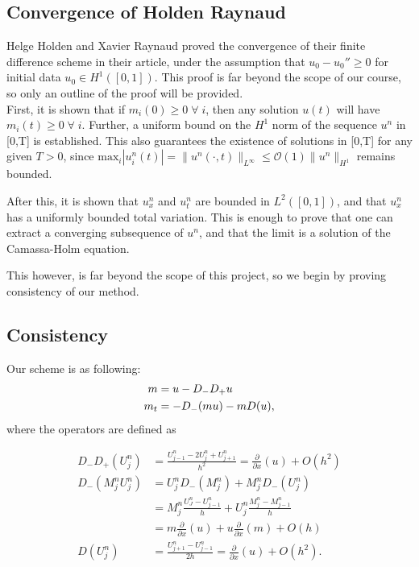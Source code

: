 \subsection*{Convergence of Holden Raynaud}
Helge Holden and Xavier Raynaud proved the convergence of their finite difference scheme in their article, under the assumption that $u_{0} - u_{0}'' \geq 0$ for initial data $u_{0} \in H^{1}([0,1])$. This proof is far beyond the scope of our course, so only an outline of the proof will be provided. \\

First, it is shown that if $m_{i}(0) \geq 0 \; \forall \;i$, then any solution $u(t)$ will have $m_{i}(t) \geq 0 \; \forall \;i $. Further, a uniform bound on the $H^{1}$ norm of the sequence $u^{n}$ in [0,T] is established. This also guarantees the existence of solutions in [0,T] for any given $T > 0$, since $\text{max}_{i}|u_{i}^{n}(t)| = \|u^{n}(\cdot,t)\|_{L^{\infty}} \leq \mathcal{O}(1) \|u^{n}\|_{H^{1}}$ remains bounded.

After this, it is shown that $u_{x}^{n}$ and $u_{t}^{n}$ are bounded in $L^{2}([0,1])$, and that $u_{x}^{n}$ has a uniformly bounded total variation. This is enough to prove that one can extract a converging subsequence of $u^{n}$, and that the limit is a solution of the Camassa-Holm equation. 

This however, is far beyond the scope of this project, so we begin by proving consistency of our method.

\subsection*{Consistency}
Our scheme is as following:
\begin{align}
m &= u - D_- D_+ u \notag \\
m_t &=- D_- ( m u ) - m D ( u ),
\label{eq:discretized}
\end{align}
where the operators are defined as

\begin{align*}
D_- D_+ \left( U_j^n \right)  &= \frac{U_{j-1}^n - 2 U_j^n + U_{j+1}^n}{h^2} = \frac{\partial}{\partial x} (u) + O \left( h^ 2 \right) \\
 D_- \left(M_j^n U_j^n \right) &= U_j^n D_-( M_j^n ) + M_j^n D_- (U_j^n) \\
  &= M_j^n \frac{U_J^n - U_{j-1}^n}{h} + U_j^n \frac{M_{j}^n - M_{j-1}^n}{h} \\
  &= m \frac{\partial}{\partial x} (u) + u \frac{\partial}{\partial x} (m) + O \left( h \right)  \\
D \left(U_j^n \right) &= \frac{U_{j+1}^n - U_{j-1}^n}{2h} = \frac{\partial}{\partial x} (u) + O \left( h^2 \right).
\end{align*}

